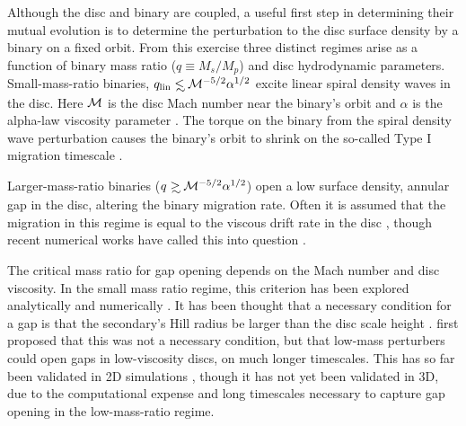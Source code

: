 Although the disc and binary are coupled, a useful first step in
determining their mutual evolution is to determine the perturbation to
the disc surface density by a binary on a fixed orbit. From this
exercise three distinct regimes arise as a function of binary mass 
ratio ($q \equiv M_s/M_p$) and disc hydrodynamic parameters. 
Small-mass-ratio binaries, $q_{\rm{lin}} \lsim \Mach^{-5/2}\alpha^{1/2}$
\citep{DuffellMac:2013:smallqGapOpen} excite linear spiral density
waves in the disc. Here $\mathcal{M}$ is the disc Mach number near the
binary's orbit and $\alpha$ is the alpha-law viscosity parameter
\citep{SS73}. The torque on the binary from the spiral density wave
perturbation causes the binary's orbit to shrink on the so-called Type
I migration timescale \citep{GT79, GT80, Ward:1997}.


Larger-mass-ratio binaries ($q \gsim \Mach^{-5/2}\alpha^{1/2}$) open a low surface density, annular gap in the disc, altering the binary migration rate. Often it is assumed that the migration in this regime is equal to the viscous drift rate in the disc \citep{LinPapa86b, NelsonKley:2000, DAngelowLubow:2008}, though recent numerical works have called this into question  \citep{Edgar:2008, DuffellFTV:2014, DurmannKley:2015}.

The critical mass ratio for gap opening depends on the Mach number and disc viscosity. In the small mass ratio regime, this criterion has been explored analytically \citep[{\em e.g.},][]{GT79, GT80, PapaPringle:1977} and numerically \citep[{\em e.g.},][]{Bryden:1999, NelsonKley:2000,Papa:2004:MHDGapopen, Zhu:2013:GapOpen}. It has been thought that a necessary condition for a gap is that the secondary's Hill radius be larger than the disc scale height \citep{LinPapa:1993:ConfProcRev, CMM:2006}. \cite{GoodmanRafikov:2001} first proposed that this was not a necessary condition, but that low-mass perturbers could open gaps in low-viscosity discs, on much longer timescales. This has so far been validated in 2D simulations \citep{DongRafII:2011, DM2012:gaps, DuffellMac:2013:smallqGapOpen, FungGaps:2014}, though it has not yet been validated in 3D, due to the computational expense and long timescales necessary to capture gap opening in the low-mass-ratio regime.




